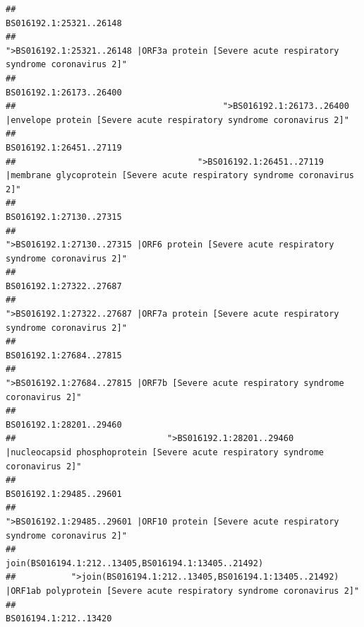 \documentclass[
]{article}
\begin{document}
\begin{verbatim}
##                                                                                                                BS016192.1:25321..26148 
##                                            ">BS016192.1:25321..26148 |ORF3a protein [Severe acute respiratory syndrome coronavirus 2]" 
##                                                                                                                BS016192.1:26173..26400 
##                                         ">BS016192.1:26173..26400 |envelope protein [Severe acute respiratory syndrome coronavirus 2]" 
##                                                                                                                BS016192.1:26451..27119 
##                                    ">BS016192.1:26451..27119 |membrane glycoprotein [Severe acute respiratory syndrome coronavirus 2]" 
##                                                                                                                BS016192.1:27130..27315 
##                                             ">BS016192.1:27130..27315 |ORF6 protein [Severe acute respiratory syndrome coronavirus 2]" 
##                                                                                                                BS016192.1:27322..27687 
##                                            ">BS016192.1:27322..27687 |ORF7a protein [Severe acute respiratory syndrome coronavirus 2]" 
##                                                                                                                BS016192.1:27684..27815 
##                                                    ">BS016192.1:27684..27815 |ORF7b [Severe acute respiratory syndrome coronavirus 2]" 
##                                                                                                                BS016192.1:28201..29460 
##                              ">BS016192.1:28201..29460 |nucleocapsid phosphoprotein [Severe acute respiratory syndrome coronavirus 2]" 
##                                                                                                                BS016192.1:29485..29601 
##                                            ">BS016192.1:29485..29601 |ORF10 protein [Severe acute respiratory syndrome coronavirus 2]" 
##                                                                                    join(BS016194.1:212..13405,BS016194.1:13405..21492) 
##           ">join(BS016194.1:212..13405,BS016194.1:13405..21492) |ORF1ab polyprotein [Severe acute respiratory syndrome coronavirus 2]" 
##                                                                                                                  BS016194.1:212..13420 

\end{verbatim}
\end{document}
